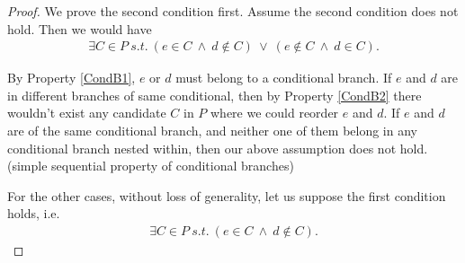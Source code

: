         \begin{proof}

            We prove the second condition first. 
            Assume the second condition does not hold. 
            Then we would have
            \begin{align*}
                \exists C \in P \ s.t. \ 
                (e \in C \ \wedge \ d \notin C) \ \vee \ 
                (e \notin C \ \wedge \ d \in C).
            \end{align*}
            
            By Property \ref{CondB1}, $e$ or $d$ must belong to a conditional branch. 
            If $e$ and $d$ are in different branches of same conditional, then by Property \ref{CondB2} there wouldn't exist any candidate $C$ in $P$ where we could reorder $e$ and $d$. 
            If $e$ and $d$ are of the same conditional branch, and neither one of them belong in any conditional branch nested within, then our above assumption does not hold. (simple sequential property of conditional branches)
            
            For the other cases, without loss of generality, let us suppose the first condition holds, i.e. 
            \begin{align*}
                \exists C \in P \ s.t. \ 
                (e \in C \ \wedge \ d \notin C).
            \end{align*}


\end{proof}
